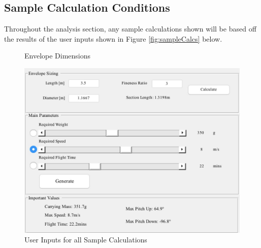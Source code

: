 \documentclass[../main.tex]{subfiles}
\begin{document}
	
\subsection{Sample Calculation Conditions} \label{sampleCalcs}
Throughout the analysis section, any sample calculations shown will be based off the results of the user inputs shown in Figure \ref{fig:sampleCalcs} below.


	\begin{figure}[H]
		\centering
		\caption{Envelope Dimensions}
		\includegraphics[width=.7\linewidth]{img/gui/sampleCalculationInputs.JPG}
		\caption{User Inputs for all Sample Calculations}
		\label{fig:envelopeDimensions}
	\end{figure}
\end{document}
